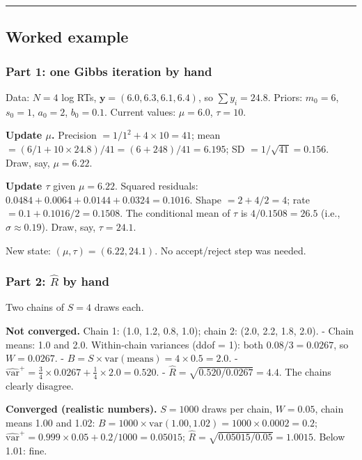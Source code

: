\begin{center}\rule{0.5\linewidth}{0.5pt}\end{center}


\subsection{Worked example}

\subsubsection{Part 1: one Gibbs iteration by hand}

Data: \(N = 4\) log RTs, \(\mathbf{y} = (6.0, 6.3, 6.1, 6.4)\), so
\(\sum y_i = 24.8\). Priors: \(m_0 = 6\), \(s_0 = 1\), \(a_0 = 2\),
\(b_0 = 0.1\). Current values: \(\mu = 6.0\), \(\tau = 10\).

\textbf{Update \(\mu\).} Precision \(= 1/1^2 + 4 \times 10 = 41\); mean
\(= (6/1 + 10 \times 24.8)/41 = (6 + 248)/41 = 6.195\); SD
\(= 1/\sqrt{41} = 0.156\). Draw, say, \(\mu = 6.22\).

\textbf{Update \(\tau\)} given \(\mu = 6.22\). Squared residuals:
\(0.0484 + 0.0064 + 0.0144 + 0.0324 = 0.1016\). Shape \(= 2 + 4/2 = 4\);
rate \(= 0.1 + 0.1016/2 = 0.1508\). The conditional mean of \(\tau\) is
\(4/0.1508 = 26.5\) (i.e., \(\sigma \approx 0.19\)). Draw, say,
\(\tau = 24.1\).

New state: \((\mu, \tau) = (6.22, 24.1)\). No accept/reject step was
needed.

\subsubsection{\texorpdfstring{Part 2: \(\hat R\) by
hand}{Part 2: \textbackslash hat R by hand}}

Two chains of \(S = 4\) draws each.

\textbf{Not converged.} Chain 1: (1.0, 1.2, 0.8, 1.0); chain 2: (2.0,
2.2, 1.8, 2.0). - Chain means: 1.0 and 2.0. Within-chain variances (ddof
= 1): both \(0.08/3 = 0.0267\), so \(W = 0.0267\). -
\(B = S \times \mathrm{var}(\text{means}) = 4 \times 0.5 = 2.0\). -
\(\widehat{\mathrm{var}}^{+} = \tfrac34 \times 0.0267 + \tfrac14 \times 2.0 = 0.520\).
- \(\hat R = \sqrt{0.520/0.0267} = 4.4\). The chains clearly disagree.

\textbf{Converged (realistic numbers).} \(S = 1000\) draws per chain,
\(W = 0.05\), chain means 1.00 and 1.02:
\(B = 1000 \times \mathrm{var}(1.00, 1.02) = 1000 \times 0.0002 = 0.2\);
\(\widehat{\mathrm{var}}^{+} = 0.999 \times 0.05 + 0.2/1000 = 0.05015\);
\(\hat R = \sqrt{0.05015/0.05} = 1.0015\). Below 1.01: fine.

